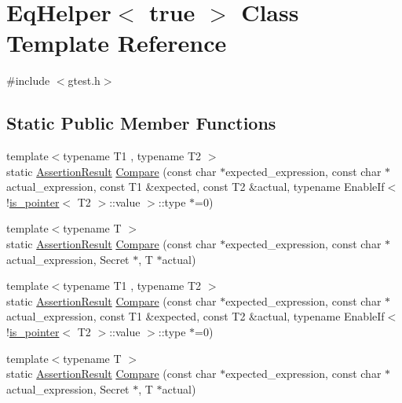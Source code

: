 \hypertarget{classtesting_1_1internal_1_1EqHelper_3_01true_01_4}{\section{\-Eq\-Helper$<$ true $>$ \-Class \-Template \-Reference}
\label{dd/df9/classtesting_1_1internal_1_1EqHelper_3_01true_01_4}
}


{\ttfamily \#include $<$gtest.\-h$>$}

\subsection*{\-Static \-Public \-Member \-Functions}
\begin{DoxyCompactItemize}
\item 
{\footnotesize template$<$typename T1 , typename T2 $>$ }\\static \hyperlink{classtesting_1_1AssertionResult}{\-Assertion\-Result} \hyperlink{classtesting_1_1internal_1_1EqHelper_3_01true_01_4_a23490b15bf58a5b387be44daccd5435f}{\-Compare} (const char $\ast$expected\-\_\-expression, const char $\ast$actual\-\_\-expression, const \-T1 \&expected, const \-T2 \&actual, typename \-Enable\-If$<$!\hyperlink{structtesting_1_1internal_1_1is__pointer}{is\-\_\-pointer}$<$ \-T2 $>$\-::value $>$\-::type $\ast$=0)
\item 
{\footnotesize template$<$typename T $>$ }\\static \hyperlink{classtesting_1_1AssertionResult}{\-Assertion\-Result} \hyperlink{classtesting_1_1internal_1_1EqHelper_3_01true_01_4_ae8c81bf6bf04148ff4f2e5ef7d9ec9eb}{\-Compare} (const char $\ast$expected\-\_\-expression, const char $\ast$actual\-\_\-expression, \-Secret $\ast$, \-T $\ast$actual)
\item 
{\footnotesize template$<$typename T1 , typename T2 $>$ }\\static \hyperlink{classtesting_1_1AssertionResult}{\-Assertion\-Result} \hyperlink{classtesting_1_1internal_1_1EqHelper_3_01true_01_4_a23490b15bf58a5b387be44daccd5435f}{\-Compare} (const char $\ast$expected\-\_\-expression, const char $\ast$actual\-\_\-expression, const \-T1 \&expected, const \-T2 \&actual, typename \-Enable\-If$<$!\hyperlink{structtesting_1_1internal_1_1is__pointer}{is\-\_\-pointer}$<$ \-T2 $>$\-::value $>$\-::type $\ast$=0)
\item 
{\footnotesize template$<$typename T $>$ }\\static \hyperlink{classtesting_1_1AssertionResult}{\-Assertion\-Result} \hyperlink{classtesting_1_1internal_1_1EqHelper_3_01true_01_4_ae8c81bf6bf04148ff4f2e5ef7d9ec9eb}{\-Compare} (const char $\ast$expected\-\_\-expression, const char $\ast$actual\-\_\-expression, \-Secret $\ast$, \-T $\ast$actual)
\end{DoxyCompactItemize}


